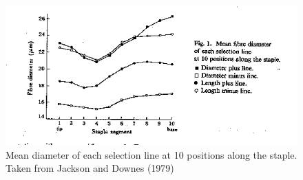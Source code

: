 %

\begin{figure}[h]
  \centering
   \includegraphics[width=1.0\textwidth]{dproflines.png}
  \caption{Mean diameter of each selection line at 10 positions along the staple. Taken from Jackson and Downes (1979)~\cite{jack:79}}
  \label{fig:dproflines}
\end{figure}

%

